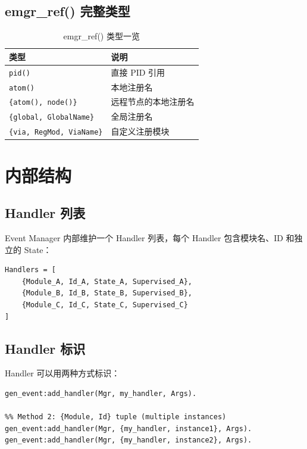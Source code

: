 \documentclass[a4paper,11pt]{article}
\begin{document}
\subsection{emgr\_ref() 完整类型}

\begin{table}[H]
\centering
\begin{tabular}{@{}ll@{}}
\toprule
\textbf{类型} & \textbf{说明} \\
\midrule
\texttt{pid()} & 直接 PID 引用 \\
\texttt{atom()} & 本地注册名 \\
\texttt{\{atom(), node()\}} & 远程节点的本地注册名 \\
\texttt{\{global, GlobalName\}} & 全局注册名 \\
\texttt{\{via, RegMod, ViaName\}} & 自定义注册模块 \\
\bottomrule
\end{tabular}
\caption{emgr\_ref() 类型一览}
\end{table}


\section{内部结构}

\subsection{Handler 列表}

Event Manager 内部维护一个 Handler 列表，每个 Handler 包含模块名、ID 和独立的 State：

\begin{lstlisting}[style=erlangstyle]
%% Internal handler record (simplified)
Handlers = [
    {Module_A, Id_A, State_A, Supervised_A},
    {Module_B, Id_B, State_B, Supervised_B},
    {Module_C, Id_C, State_C, Supervised_C}
]
\end{lstlisting}

\subsection{Handler 标识}

Handler 可以用两种方式标识：

\begin{lstlisting}[style=erlangstyle]
%% Method 1: Module name only (one instance per module)
gen_event:add_handler(Mgr, my_handler, Args).

%% Method 2: {Module, Id} tuple (multiple instances)
gen_event:add_handler(Mgr, {my_handler, instance1}, Args).
gen_event:add_handler(Mgr, {my_handler, instance2}, Args).
\end{lstlisting}
\end{document}
